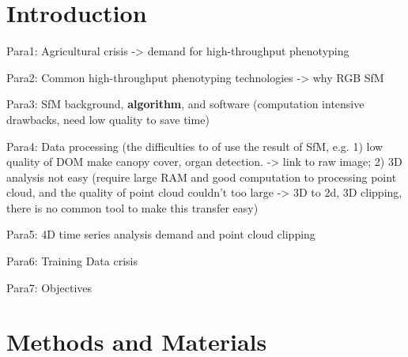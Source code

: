 \documentclass[sensors,article,submit,moreauthors, xelatex]{Definitions/mdpi}
\begin{document}
\section{Introduction}
Para1: Agricultural crisis -> demand for high-throughput phenotyping

Para2: Common high-throughput phenotyping technologies -> why RGB SfM

Para3: SfM background, \textbf{algorithm}, and software (computation intensive drawbacks, need low quality to save time)

Para4: Data processing (the difficulties to of use the result of SfM, e.g. 1) low quality of DOM make canopy cover, organ detection. -> link to raw image; 2) 3D analysis not easy (require large RAM and good computation to processing point cloud, and the quality of point cloud couldn't too large -> 3D to 2d, 3D clipping, there is no common tool to make this transfer easy)


Para5: 4D time series analysis demand and point cloud clipping

Para6: Training Data crisis

Para7: Objectives

\section{Methods and Materials}
\end{document}
